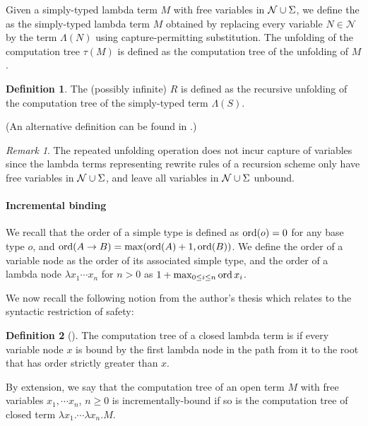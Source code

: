 \documentclass[a4paper]{article}[12pt]
\theoremstyle{remark}
\newtheorem{remark}{Remark}[section]
\theoremstyle{definition}
\newtheorem{definition}{Definition}[section]
\begin{document}
Given a simply-typed lambda term $M$ with free variables in $\mathcal{N} \cup \Sigma$, we define the  as the simply-typed lambda term $M$ obtained by replacing every variable $N \in \mathcal{N}$ by the term $\Lambda (N)$ using capture-permitting substitution. The unfolding of the computation tree $\tau(M)$ is defined as the computation tree of the unfolding of $M$.

\begin{definition}
The (possibly infinite)  $R$ is defined as the recursive unfolding
of the computation tree of the simply-typed term $\Lambda(S)$.

(An alternative definition can be found in \cite{OngLics2006}.)
\end{definition}
\begin{remark} The repeated unfolding operation does not incur capture of variables since the lambda terms representing rewrite rules of a recursion scheme only have free variables in $\mathcal{N} \cup \Sigma$, and leave all variables in $\mathcal{N} \cup \Sigma$ unbound.
\end{remark}

\paragraph{Incremental binding}
We recall that the order of a simple type is defined as $\mathop{\mathrm{ord}}(o) = 0$ for any base type $o$, and $\mathop{\mathrm{ord}}(A \rightarrow B) = \max(\mathop{\mathrm{ord}}(A)+1, \mathop{\mathrm{ord}}(B))$. We define the order of a variable node as the order of its associated simple type, and the order of a lambda node $\lambda x_1 \cdots x_n$ for $n>0$ as $1 + \max_{0\leq i\leq n} \mathop{\mathrm{ord}}{x_i}$.

We now recall the following notion from the author's thesis \cite{BlumPhd,blumong:safelambdacalculus} which relates to the syntactic restriction of safety:
\begin{definition}[\cite{BlumPhd,blumong:safelambdacalculus}]
The computation tree of a closed lambda term is  if every variable node $x$ is bound by the first lambda node in the path from it to the root that has order strictly greater than $x$.

By extension, we say that the computation tree of an open term $M$ with free variables $x_1, \cdots x_n$, $n\geq 0$ is incrementally-bound if so is the computation tree of closed term $\lambda x_1 . \cdots \lambda x_n . M$.
\end{definition}
\end{document}
